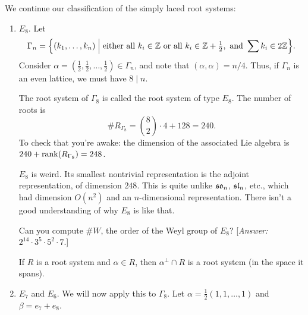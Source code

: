  We continue our classification of the simply laced root systems:
\begin{enumerate}
  \item $E_8$. Let
    \[
      \Gamma_n = \Bigl\{(k_1, \dots, k_n) \Bigm| \text{either all } k_i \in \Z
        \text{ or all } k_i \in \Z + \tfrac12, \text{ and } \sum k_i \in 2\Z\Bigr\}.
    \]
    Consider $\alpha = (\frac12, \frac12, \dots, \frac12) \in \Gamma_n$, and
    note that $(\alpha, \alpha) = n/4$. Thus, if $\Gamma_n$ is an even lattice,
    we must have $8 \mid n$.

    \begin{exercise}\leavevmode
    \end{exercise}

    The root system of $\Gamma_8$ is called the root system of type $E_8$.
    The number of roots is
    \[
      \#R_{\Gamma_8} = \binom{8}{2} \cdot 4 + 128 = 240.
    \]
    To check that you're awake: the dimension of the associated Lie algebra is
    $240 + \rank(R_{\Gamma_8}) = 248$.

    \begin{remark}
    $E_8$ is weird. Its smallest nontrivial representation is the adjoint
    representation, of dimension $248$. This is quite unlike $\so_n$, $\sl_n$,
    etc., which had dimension $O(n^2)$ and an $n$-dimensional representation.
    There isn't a good understanding of why $E_8$ is like that.
    \end{remark}

    \begin{exercise}
    Can you compute $\#W$, the order of the Weyl group of $E_8$?
    [\emph{Answer:} $2^{14} \cdot 3^5 \cdot 5^2 \cdot 7$.]
    \end{exercise}

    \begin{exercise}
    If $R$ is a root system and $\alpha \in R$, then $\alpha^\perp \cap R$ is a
    root system (in the space it spans).
    \end{exercise}
  \item $E_7$ and $E_6$. We will now apply this to $\Gamma_8$. Let
    $\alpha = \frac12(1, 1, \dots, 1)$ and $\beta = e_7 + e_8$.


\end{enumerate}
